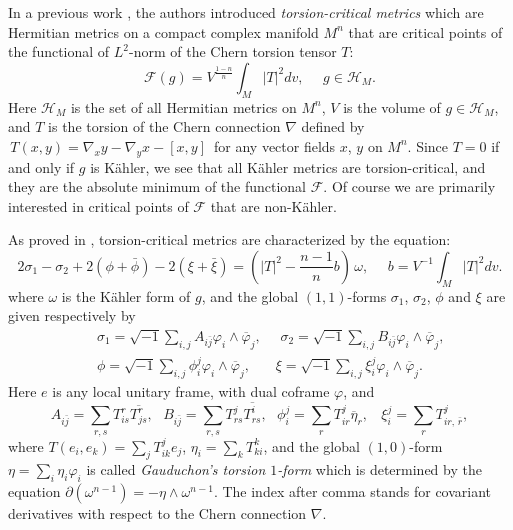 \documentclass{amsart}
\begin{document}
In a previous work \cite{ZhangZ}, the authors introduced {\em torsion-critical metrics} which are Hermitian metrics on a compact complex manifold $M^n$ that are critical points of the functional of $L^2$-norm of the Chern torsion tensor $T$:
\begin{equation*} \label{eq:F}
{\mathcal F} (g) = V^{\frac{1-n}{n}} \int_M |T|^2 dv, \ \ \ \ \ \ g\in {\mathcal H}_M.
\end{equation*}
Here ${\mathcal H}_M$ is the set of all Hermitian metrics on $M^n$, $V$ is the volume of $g\in {\mathcal H}_M$, and $T$ is the torsion of the Chern connection $\nabla$ defined by $\,T(x,y)=\nabla_xy-\nabla_yx-[x,y]\,$ for any vector fields $x$, $y$ on $M^n$. Since $T=0$ if and only if $g$ is K\"ahler, we see that all K\"ahler metrics are torsion-critical, and they are the absolute minimum of the functional ${\mathcal F}$. Of course we are primarily interested in critical points of ${\mathcal F}$ that are non-K\"ahler. 


As proved in \cite{ZhangZ}, torsion-critical metrics are characterized by the equation:
\begin{equation} \label{eq:tor-crit}
2\sigma_1 - \sigma_2 +2(\phi + \bar{\phi}) - 2 (\xi + \bar{\xi}) = (|T|^2-\frac{n-1}{n}b)\, \omega, \ \ \ \ \ \ b=V^{-1}\int_M|T|^2dv.
\end{equation}
where $\omega$ is the K\"ahler form of $g$, and the global $(1,1)$-forms $\sigma_1$, $\sigma_2$, $\phi$ and $\xi$ are given respectively by
\begin{eqnarray*}
&& \sigma_1= \sqrt{-1}\sum_{i,j} A_{i\bar{j}} \varphi_i \wedge \overline{\varphi}_j, \ \ \ \ \ \ \sigma_2= \sqrt{-1}\sum_{i,j} B_{i\bar{j}} \varphi_i \wedge \overline{\varphi}_j, \\
&& \phi = \sqrt{-1}\sum_{i,j} \phi_{i}^j \varphi_i \wedge \overline{\varphi}_j, \ \ \ \ \ \ \ \ \xi = \sqrt{-1}\sum_{i,j} \xi_{i}^j \varphi_i \wedge \overline{\varphi}_j.
\end{eqnarray*}
Here $e$ is any local unitary frame, with dual coframe $\varphi$, and
\begin{equation} \label{eq:AB}
A_{i\bar{j}} = \sum_{r,s}T^r_{is}\overline{T^r_{js}}, \ \ \ B_{i\bar{j}} = \sum_{r,s}T^j_{rs}\overline{T^i_{rs}}, \ \ \ \phi_{i}^j = \sum_r T^j_{ir} \overline{\eta}_r, \ \ \ \ \xi_{i}^j = \sum_r T^j_{ir,\,\bar{r}} ,
\end{equation}
where $T(e_i,e_k)=\sum_j T^j_{ik}e_j$, $\eta_i=\sum_k T^k_{ki}$, and the global $(1,0)$-form $\eta =\sum_i \eta_i\varphi_i$ is called {\em Gauduchon's torsion $1$-form} which is determined  by the equation $\partial (\omega^{n-1})=-\eta \wedge \omega^{n-1}$. The index after comma stands for covariant derivatives with respect to the Chern connection $\nabla$. 
\end{document}
